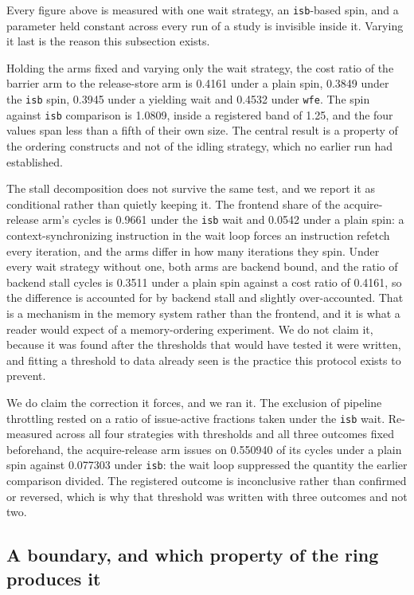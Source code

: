 \documentclass[conference]{IEEEtran}
\begin{document}
Every figure above is measured with one wait strategy, an \texttt{isb}-based
spin, and a parameter held constant across every run of a study is invisible
inside it. Varying it last is the reason this subsection exists.

Holding the arms fixed and varying only the wait strategy, the cost ratio of
the barrier arm to the release-store arm is 0.4161 under a plain spin, 0.3849
under the \texttt{isb} spin, 0.3945 under a yielding wait and 0.4532 under
\texttt{wfe}. The spin against \texttt{isb} comparison is 1.0809, inside a
registered band of 1.25, and the four values span less than a fifth of their
own size. The central result is a property of the ordering constructs and not
of the idling strategy, which no earlier run had established.

The stall decomposition does not survive the same test, and we report it as
conditional rather than quietly keeping it. The frontend share of the
acquire-release arm's cycles is 0.9661 under the \texttt{isb} wait and 0.0542
under a plain spin: a context-synchronizing instruction in the wait loop forces
an instruction refetch every iteration, and the arms differ in how many
iterations they spin. Under every wait strategy without one, both arms are
backend bound, and the ratio of backend stall cycles is 0.3511 under a plain
spin against a cost ratio of 0.4161, so the difference is accounted for by
backend stall and slightly over-accounted. That is a mechanism in the memory
system rather than the frontend, and it is what a reader would expect of a
memory-ordering experiment. We do not claim it, because it was found after the
thresholds that would have tested it were written, and fitting a threshold to
data already seen is the practice this protocol exists to prevent.

We do claim the correction it forces, and we ran it. The exclusion of pipeline
throttling rested on a ratio of issue-active fractions taken under the
\texttt{isb} wait. Re-measured across all four strategies with thresholds and
all three outcomes fixed beforehand, the acquire-release arm issues on 0.550940
of its cycles under a plain spin against 0.077303 under \texttt{isb}: the wait
loop suppressed the quantity the earlier comparison divided. The registered
outcome is inconclusive rather than confirmed or reversed, which is why that
threshold was written with three outcomes and not two.

\subsection{A boundary, and which property of the ring produces it}
\end{document}
